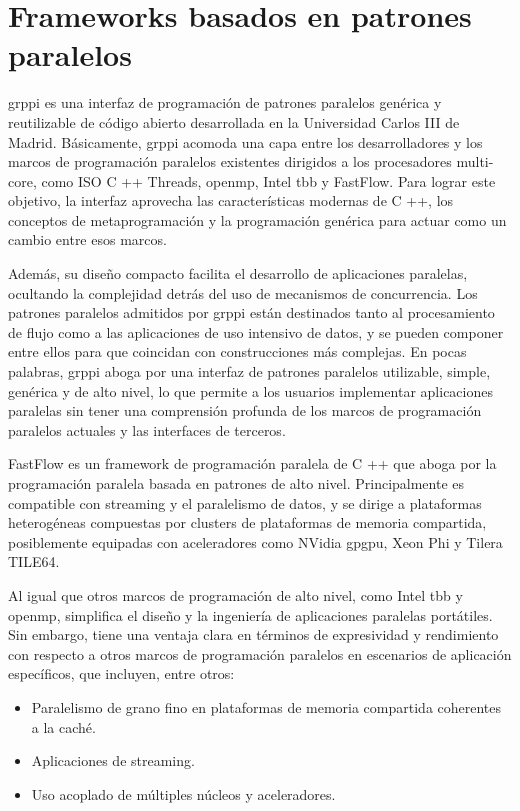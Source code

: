 \section{Frameworks basados en patrones paralelos}
\label{sec:frameworks_basados_patrones}

\acrshort{grppi} \cite{grppi-github} es una interfaz de programación de patrones paralelos genérica y reutilizable de código abierto desarrollada en la Universidad Carlos III de Madrid. Básicamente, \acrshort{grppi} acomoda una capa entre los desarrolladores y los marcos de programación paralelos existentes dirigidos a los procesadores multi-core, como ISO C ++ Threads,  \acrshort{openmp}, Intel \acrshort{tbb} y FastFlow. Para lograr este objetivo, la interfaz aprovecha las características modernas de C ++, los conceptos de metaprogramación y la programación genérica para actuar como un cambio entre esos marcos.

Además, su diseño compacto facilita el desarrollo de aplicaciones paralelas, ocultando la complejidad detrás del uso de mecanismos de concurrencia. Los patrones paralelos admitidos por \acrshort{grppi} están destinados tanto al procesamiento de flujo como a las aplicaciones de uso intensivo de datos, y se pueden componer entre ellos para que coincidan con construcciones más complejas. En pocas palabras, \acrshort{grppi} aboga por una interfaz de patrones paralelos utilizable, simple, genérica y de alto nivel, lo que permite a los usuarios implementar aplicaciones paralelas sin tener una comprensión profunda de los marcos de programación paralelos actuales y las interfaces de terceros.

FastFlow \cite{Fastflow, Aldinucci12fastflow:high-level} es un framework de programación paralela de C ++ que aboga por la programación paralela basada en patrones de alto nivel. Principalmente es compatible con streaming y el paralelismo de datos, y se dirige a plataformas heterogéneas compuestas por clusters de plataformas de memoria compartida, posiblemente equipadas con aceleradores como NVidia \acrshort{gpgpu}, Xeon Phi y Tilera TILE64.

Al igual que otros marcos de programación de alto nivel, como Intel \acrshort{tbb} y  \acrshort{openmp}, simplifica el diseño y la ingeniería de aplicaciones paralelas portátiles. Sin embargo, tiene una ventaja clara en términos de expresividad y rendimiento con respecto a otros marcos de programación paralelos en escenarios de aplicación específicos, que incluyen, entre otros:

\begin{itemize}
    \item Paralelismo de grano fino en plataformas de memoria compartida coherentes a la caché.
    \item Aplicaciones de streaming.
    \item Uso acoplado de múltiples núcleos y aceleradores.
\end{itemize}

